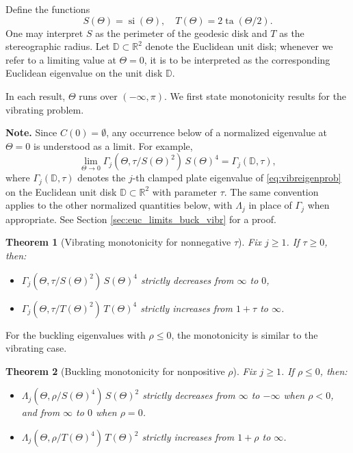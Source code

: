 \documentclass[11pt]{amsart}
\newtheorem{theorem}{Theorem}[section]
\theoremstyle{definition}
\numberwithin{equation}{section}
\newcommand{\R}{\mathbb{R}}
\newcommand{\D}{\mathbb{D}}
\newcommand{\si}{\operatorname{si}}
\newcommand{\ta}{\operatorname{ta}}
\begin{document}
Define the functions
\[
S(\Theta) = \si(\Theta), \quad T(\Theta) = 2\ta(\Theta/2).
\]
One may interpret $S$ as the perimeter of the geodesic disk and $T$ as the stereographic radius. Let $\D\subset\R^2$ denote the Euclidean unit disk; whenever we refer to a limiting value at $\Theta=0$, it is to be interpreted as the corresponding Euclidean eigenvalue on the unit disk $\D$.


In each result, $\Theta$ runs over $(-\infty, \pi)$. We first state monotonicity results for the vibrating problem. 

\textbf{Note.}
Since $C(0)=\emptyset$, any occurrence below of a normalized eigenvalue at $\Theta=0$
is understood as a limit. For example,
\[
\lim_{\Theta\to 0}\Gamma_j(\Theta,\tau/S(\Theta)^2)\,S(\Theta)^4=\Gamma_j(\D,\tau),
\]
where $\Gamma_j(\D,\tau)$ denotes the $j$-th clamped plate eigenvalue of \eqref{eq:vibreigenprob} on the Euclidean
unit disk $\D\subset\R^2$ with parameter $\tau$. The same convention applies to the
other normalized quantities below, with $\Lambda_j$ in place of $\Gamma_j$ when appropriate. See Section \ref{sec:euc_limits_buck_vibr} for a proof.

\begin{theorem}[Vibrating monotonicity for nonnegative $\tau$]\label{th:vibratingmono}
Fix $j\ge 1$. If $\tau\ge 0$, then:
\begin{itemize}
\item $\Gamma_j(\Theta,\tau/S(\Theta)^2)\,S(\Theta)^4$ strictly decreases from $\infty$ to $0$,
\item $\Gamma_j(\Theta,\tau/T(\Theta)^2)\,T(\Theta)^4$ strictly increases from $1+\tau$ to $\infty$.
\end{itemize}
\end{theorem}

For the buckling eigenvalues with $\rho \leq 0$, the monotonicity is similar to the vibrating case.

\begin{theorem}[Buckling monotonicity for nonpositive $\rho$]\label{th:bucklingneg}
Fix $j\ge 1$. If $\rho\le 0$, then:
\begin{itemize}
\item $\Lambda_j(\Theta,\rho/S(\Theta)^4)\,S(\Theta)^2$ strictly decreases from $\infty$ to $-\infty$ when $\rho<0$, and from $\infty$ to $0$ when $\rho=0$.
\item $\Lambda_j(\Theta,\rho/T(\Theta)^4)\,T(\Theta)^2$ strictly increases from $1+\rho$ to $\infty$.
\end{itemize}
\end{theorem}
\end{document}
